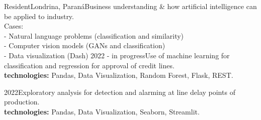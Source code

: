 \documentclass[
    10pt,
    english,
]{article}
\begin{document}
{Resident}{Londrina, Paraná}{Business understanding \& how artificial intelligence can be applied to industry. \\ Cases: \\
    \tab - Natural language problems (classification and similarity) \\
    \tab - Computer vision models (GANs and classification) \\
    \tab - Data visualization (Dash)}
{}{2022 - in progress}{\tab[0.01cm] Use of machine learning for classification and regression for approval of
    credit lines. \\ \tab[0.01cm] \textbf{technologies:} Pandas, Data Visualization, Random Forest, Flask, REST.}

\noindent {}
{}{2022}{\tab[0.01cm]
    Exploratory analysis for detection and alarming at line delay points
    of production. \\ \tab[0.01cm] \textbf{technologies:} Pandas, Data Visualization, Seaborn, Streamlit.}
\end{document}
